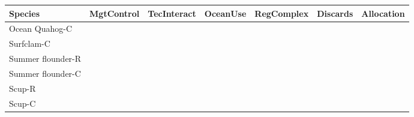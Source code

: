 \documentclass[11pt,]{article}
\begin{document}
\begin{table}[H]
\centering\begingroup\fontsize{9}{11}\selectfont

\begin{tabular}{lllllll}
\toprule
Species & MgtControl & TecInteract & OceanUse & RegComplex & Discards & Allocation\\
\midrule
Ocean Quahog-C & \multicolumn{1}{c}{\cellcolor{green}{\textcolor{gray}{l}}} & \multicolumn{1}{c}{\cellcolor{green}{\textcolor{gray}{l}}} & \multicolumn{1}{c}{\cellcolor{yellow}{\textcolor{gray}{lm}}} & \multicolumn{1}{c}{\cellcolor{green}{\textcolor{gray}{l}}} & \multicolumn{1}{c}{\cellcolor{green}{\textcolor{gray}{l}}} & \multicolumn{1}{c}{\cellcolor{green}{\textcolor{gray}{l}}}\\
Surfclam-C & \multicolumn{1}{c}{\cellcolor{green}{\textcolor{gray}{l}}} & \multicolumn{1}{c}{\cellcolor{green}{\textcolor{gray}{l}}} & \multicolumn{1}{c}{\cellcolor{yellow}{\textcolor{gray}{lm}}} & \multicolumn{1}{c}{\cellcolor{green}{\textcolor{gray}{l}}} & \multicolumn{1}{c}{\cellcolor{green}{\textcolor{gray}{l}}} & \multicolumn{1}{c}{\cellcolor{green}{\textcolor{gray}{l}}}\\
Summer flounder-R & \multicolumn{1}{c}{\cellcolor{orange}{\textcolor{gray}{mh}}} & \multicolumn{1}{c}{\cellcolor{green}{\textcolor{gray}{l}}} & \multicolumn{1}{c}{\cellcolor{yellow}{\textcolor{gray}{lm}}} & \multicolumn{1}{c}{\cellcolor{red}{\textcolor{gray}{h}}} & \multicolumn{1}{c}{\cellcolor{red}{\textcolor{gray}{h}}} & \multicolumn{1}{c}{\cellcolor{red}{\textcolor{gray}{h}}}\\
Summer flounder-C & \multicolumn{1}{c}{\cellcolor{yellow}{\textcolor{gray}{lm}}} & \multicolumn{1}{c}{\cellcolor{orange}{\textcolor{gray}{mh}}} & \multicolumn{1}{c}{\cellcolor{yellow}{\textcolor{gray}{lm}}} & \multicolumn{1}{c}{\cellcolor{orange}{\textcolor{gray}{mh}}} & \multicolumn{1}{c}{\cellcolor{yellow}{\textcolor{gray}{lm}}} & \multicolumn{1}{c}{\cellcolor{red}{\textcolor{gray}{h}}}\\
Scup-R & \multicolumn{1}{c}{\cellcolor{green}{\textcolor{gray}{l}}} & \multicolumn{1}{c}{\cellcolor{green}{\textcolor{gray}{l}}} & \multicolumn{1}{c}{\cellcolor{yellow}{\textcolor{gray}{lm}}} & \multicolumn{1}{c}{\cellcolor{orange}{\textcolor{gray}{mh}}} & \multicolumn{1}{c}{\cellcolor{orange}{\textcolor{gray}{mh}}} & \multicolumn{1}{c}{\cellcolor{green}{\textcolor{gray}{l}}}\\
Scup-C & \multicolumn{1}{c}{\cellcolor{green}{\textcolor{gray}{l}}} & \multicolumn{1}{c}{\cellcolor{orange}{\textcolor{gray}{mh}}} & \multicolumn{1}{c}{\cellcolor{yellow}{\textcolor{gray}{lm}}} & \multicolumn{1}{c}{\cellcolor{orange}{\textcolor{gray}{mh}}} & \multicolumn{1}{c}{\cellcolor{orange}{\textcolor{gray}{mh}}} & \multicolumn{1}{c}{\cellcolor{green}{\textcolor{gray}{l}}}\\

\end{tabular}
\end{table}
\end{document}
